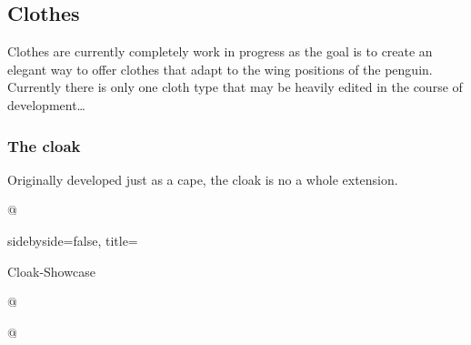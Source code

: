 \documentclass[parskip=half,english,numbers=noenddot,footnotes=nomultiple,oneside]{scrartcl}
\begin{document}
\subsection{Clothes}

Clothes are currently completely work in progress as the goal is to create an elegant way to offer clothes that adapt to the wing positions of the penguin.
Currently there is only one cloth type that may be heavily edited in the course of development\ldots

\subsubsection{The cloak}

Originally developed just as a cape, the cloak is no a whole extension.

\begin{tcblisting}{@}
\begin{tikzpicture}
	\pingu[cloak=green]
\end{tikzpicture}
\end{tcblisting}
\endshowkeyexplain

\begin{tcblisting}{sidebyside=false, title={\strut Cloak-Showcase}}
\end{tcblisting}

{\def\pingu@color@cloak{<cloak-color>}
\begin{tcblisting}{@}
\begin{tikzpicture}
	\pingu[cloak, cloak cap=green]
\end{tikzpicture}
\end{tcblisting}
\endsubkeyexplain}

{\def\pingu@color@cloak{<cloak-color>}
\begin{tcblisting}{@}
\begin{tikzpicture}
	\pingu[cloak, cloak wings color=green]
\end{tikzpicture}
\end{tcblisting}
\endsubkeyexplain}
\end{document}

